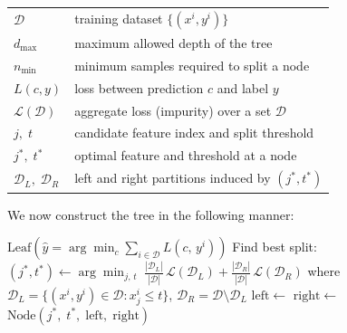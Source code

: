 \documentclass[a4paper, 11pt]{article}
\begin{document}
\begin{center}
  \begin{tabular}{ll}
    $\mathcal{D}$               & training dataset $\{(x^i, y^i)\}$ \\
    $d_{\max}$                  & maximum allowed depth of the tree \\
    $n_{\min}$                  & minimum samples required to split a node \\
    $L(c, y)$                   & loss between prediction $c$ and label $y$ \\
    $\mathcal{L}(\mathcal{D})$  & aggregate loss (impurity) over a
    set $\mathcal{D}$ \\
    $j,\; t$                    & candidate feature index and split threshold \\
    $j^*,\; t^*$                & optimal feature and threshold at a node \\
    $\mathcal{D}_L,\;\mathcal{D}_R$ & left and right partitions
    induced by $(j^*, t^*)$ \\
  \end{tabular}
\end{center}

We now construct the tree in the following manner:
\begin{algorithm}
  \caption{Decision Tree}\label{alg:}
  \begin{algorithmic}[1]
    \State \Return $\mathrm{Leaf}\!\left(\hat{y} =
    \displaystyle\arg\min_{c}\sum_{i \in \mathcal{D}} L(c,\, y^i)\right)$
    \EndIf
    \State Find best split:
    \State \quad $(j^*, t^*) \gets \displaystyle\arg\min_{j,\,t}\;
    \frac{|\mathcal{D}_L|}{|\mathcal{D}|}\,\mathcal{L}(\mathcal{D}_L)
    + \frac{|\mathcal{D}_R|}{|\mathcal{D}|}\,\mathcal{L}(\mathcal{D}_R)$
    \State \quad where $\mathcal{D}_L = \{(x^i, y^i) \in \mathcal{D}
    : x^i_{j} \leq t\}$,\; $\mathcal{D}_R = \mathcal{D} \setminus \mathcal{D}_L$
    \State $\mathrm{left}  \gets$
    \State $\mathrm{right} \gets$
    \State \Return $\mathrm{Node}(j^*,\; t^*,\; \mathrm{left},\;
    \mathrm{right})$
    \EndProcedure
  \end{algorithmic}
\end{algorithm}
\end{document}
